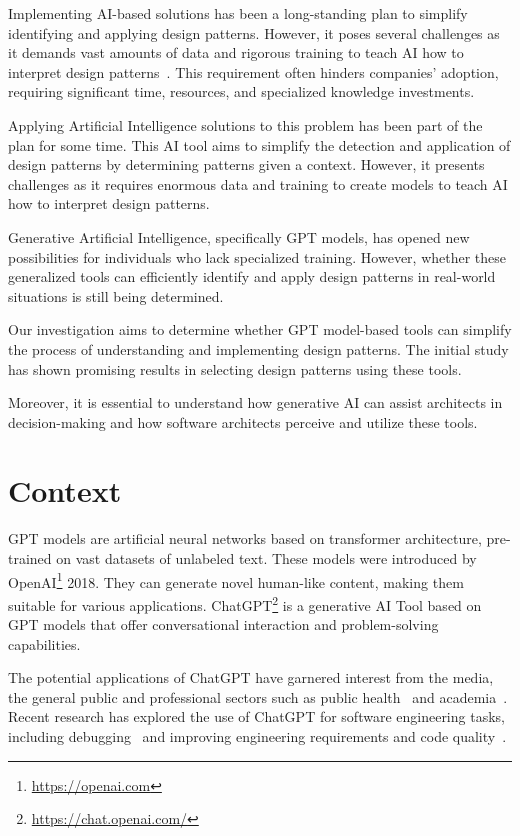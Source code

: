 Implementing AI-based solutions has been a long-standing plan to simplify identifying and applying design patterns. However, it poses several challenges as it demands vast amounts of data and rigorous training to teach AI how to interpret design patterns~\cite{Naghdipour2023}. This requirement often hinders companies' adoption, requiring significant time, resources, and specialized knowledge investments.

Applying Artificial Intelligence solutions to this problem has been part of the plan for some time. This AI tool aims to simplify the detection and application of design patterns by determining patterns given a context. However, it presents challenges as it requires enormous data and training to create models to teach AI how to interpret design patterns.

Generative Artificial Intelligence, specifically \ac{GPT} models, has opened new possibilities for individuals who lack specialized training. However, whether these generalized tools can efficiently identify and apply design patterns in real-world situations is still being determined. 

Our investigation aims to determine whether \ac{GPT} model-based tools can simplify the process of understanding and implementing design patterns. The initial study has shown promising results in selecting design patterns using these tools. 

Moreover, it is essential to understand how generative AI can assist architects in decision-making and how software architects perceive and utilize these tools.

\section{Context}\label{sec:context}
GPT models are artificial neural networks based on transformer architecture, pre-trained on vast datasets of unlabeled text. These models were introduced by OpenAI\footnote{\url{https://openai.com}} 2018. They can generate novel human-like content, making them suitable for various applications. ChatGPT\footnote{\url{https://chat.openai.com/}} is a generative AI Tool based on \ac{GPT} models that offer conversational interaction and problem-solving capabilities. 

The potential applications of ChatGPT have garnered interest from the media, the general public and professional sectors such as public health~\cite{Biswas2023} and academia~\cite{Lund2023}. Recent research has explored the use of ChatGPT for software engineering tasks, including debugging~\cite{Surameery2023} and improving engineering requirements and code quality~\cite{White2023}.

